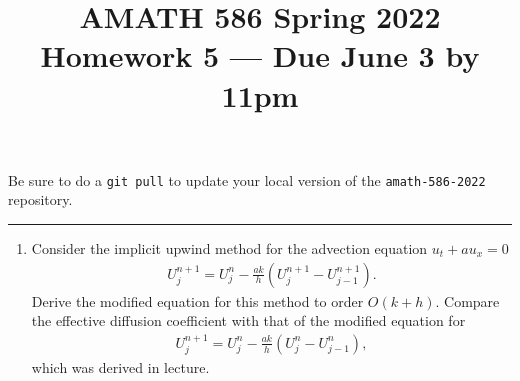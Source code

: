 \documentclass[10pt]{amsart}
\begin{document}
\pagestyle{empty}

\newcommand{\mline}{\vspace{.2in}\hrule\vspace{.2in}}


\title{\bf { AMATH 586 Spring 2022 \\ Homework 5 ---
Due June 3 by 11pm} }
\maketitle
\centerline{Be sure to do a {\tt git pull} to update your local version of the {\tt amath-586-2022} repository.}

\mline
\begin{enumerate}[label={\bf Problem~{\arabic*}:}]
\item  Consider the implicit upwind method for the advection equation $u_t + a u_x = 0$
  \begin{align*}
    U_{j}^{n+1} = U_{j}^n  - \frac{ak}{h} \left( U_j^{n+1} - U_{j-1}^{n+1} \right).
  \end{align*}
  Derive the modified equation for this method to order $O(k + h)$.  Compare the effective diffusion coefficient with that of the modified equation for
  \begin{align*}
    U_{j}^{n+1} = U_{j}^n  - \frac{ak}{h} \left( U_j^{n} - U_{j-1}^{n} \right),
  \end{align*}
  which was derived in lecture.


\end{enumerate}
\end{document}
